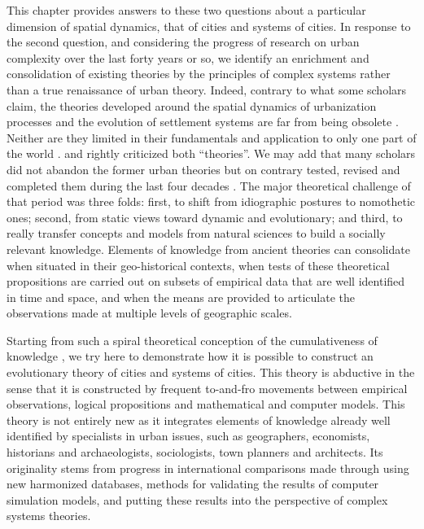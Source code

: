 \documentclass[10pt]{article}
\begin{document}
This chapter provides answers to these two questions about a particular dimension of spatial dynamics, that of cities and systems of cities. In response to the second question, and considering the progress of research on urban complexity over the last forty years or so, we identify an enrichment and consolidation of existing theories by the principles of complex systems rather than a true renaissance of urban theory. Indeed, contrary to what some scholars claim, the theories developed around the spatial dynamics of urbanization processes and the evolution of settlement systems are far from being obsolete \citep{brenner2014urban}. Neither are they limited in their fundamentals and application to only one part of the world \citep{robinson2016comparative}. \cite{scott2015nature} and \cite{wu2020emerging} rightly criticized both ``theories''. We may add that many scholars did not abandon the former urban theories but on contrary tested, revised and completed them during the last four decades \citep{pumain1997pour,pumain1998urban,pumain2003approche,pumain2020theories,batty2013new}. The major theoretical challenge of that period was three folds: first, to shift from idiographic postures to nomothetic ones; second, from static views toward dynamic and evolutionary; and third, to really transfer concepts and models from natural sciences to build a socially relevant knowledge. Elements of knowledge from ancient theories can consolidate when situated in their geo-historical contexts, when tests of these theoretical propositions are carried out on subsets of empirical data that are well identified in time and space, and when the means are provided to articulate the observations made at multiple levels of geographic scales.

Starting from such a spiral theoretical conception of the cumulativeness of knowledge \citep{pumain2005cumulativite}, we try here to demonstrate how it is possible to construct an evolutionary theory of cities and systems of cities. This theory is abductive in the sense that it is constructed by frequent to-and-fro movements between empirical observations, logical propositions and mathematical and computer models. This theory is not entirely new as it integrates elements of knowledge already well identified by specialists in urban issues, such as geographers, economists, historians and archaeologists, sociologists, town planners and architects. Its originality stems from progress in international comparisons made through using new harmonized databases, methods for validating the results of computer simulation models, and putting these results into the perspective of complex systems theories.
\end{document}
